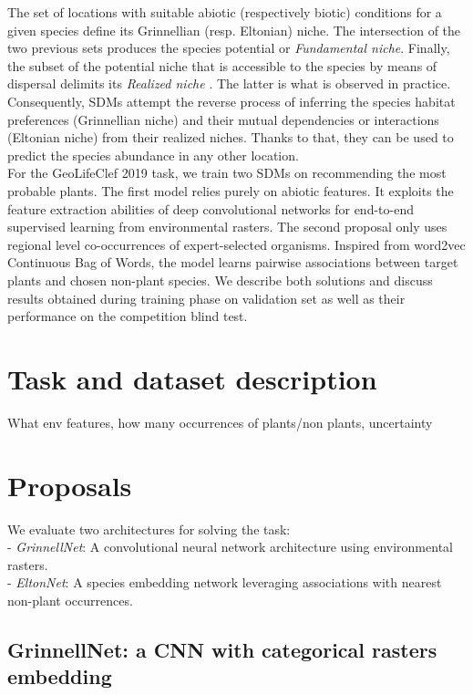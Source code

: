 \documentclass[]{article}
\begin{document}
\noindent The set of locations with suitable abiotic (respectively biotic) conditions for a given species define its Grinnellian (resp. Eltonian) niche. The intersection of the two previous sets produces the species potential or \textit{Fundamental niche}. Finally, the subset of the potential niche that is accessible to the species by means of dispersal delimits its \textit{Realized niche} \cite{peterson2011ecological}. The latter is what is observed in practice. Consequently, SDMs attempt the reverse process of inferring the species habitat preferences (Grinnellian niche) and their mutual dependencies or interactions (Eltonian niche) from their realized niches. Thanks to that, they can be used to predict the species abundance in any other location. \\

\noindent For the GeoLifeClef 2019 task, we train two SDMs on recommending the most probable plants. The first model relies purely on abiotic features. It exploits the feature extraction abilities of deep convolutional networks for end-to-end supervised learning from environmental rasters. The second proposal only uses regional level co-occurrences of expert-selected organisms. Inspired from word2vec Continuous Bag of Words, the model learns pairwise associations between target plants and chosen non-plant species. We describe both solutions and discuss results obtained during training phase on validation set as well as their performance on the competition blind test. 


\section{Task and dataset description}
What env features, how many occurrences of plants/non plants, uncertainty 

\section{Proposals}
We evaluate two architectures for solving the task:\\
- \textit{GrinnellNet}: A convolutional neural network architecture using environmental rasters.\\
- \textit{EltonNet}: A species embedding network leveraging associations with nearest non-plant occurrences.

\subsection{GrinnellNet: a CNN with categorical rasters embedding}
\end{document}

